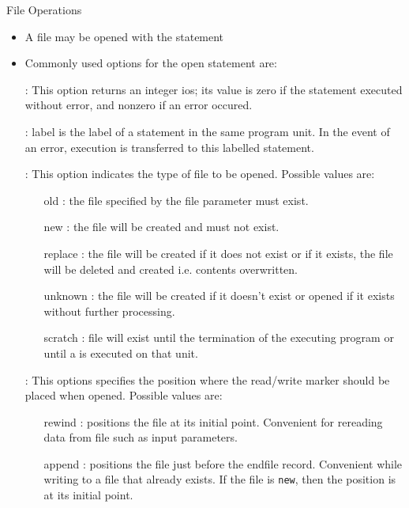 \documentclass[10pt,t]{beamer}
\begin{document}
\begin{frame}{File Operations}
  \begin{itemize}
    \item A file may be opened with the statement
    \item[]
    \item Commonly used options for the open statement are:
    \item[]: This option returns an integer ios; its value is zero if the statement executed without error, and nonzero if an error occured.
    \item[]: label is the label of a statement in the same program unit. In the event of an error, execution is transferred to this labelled statement. 
    \item[]: This option indicates the type of file to be opened. Possible values are:
      \begin{itemize}
        \item[old]: the file specified by the file parameter must exist. 
        \item[new]: the file will be created and must not exist. 
        \item[replace]: the file will be created if it does not exist or if it exists, the file will be deleted and created i.e. contents overwritten.
        \item[unknown]: the file will be created if it doesn't exist or opened if it exists without further processing.
        \item[scratch]: file will exist until the termination of the executing program or until a  is executed on that unit.
      \end{itemize}
    \item[] : This options specifies the position where the read/write marker should be placed when opened. Possible values are:
      \begin{itemize}
        \item[rewind]: positions the file at its initial point. Convenient for rereading data from file such as input parameters.
        \item[append]: positions the file just before the endfile record. Convenient while writing to a file that already exists. If the file is \texttt{new}, then the position is at its initial point.
      \end{itemize}

\end{itemize}
\end{frame}
\end{document}
